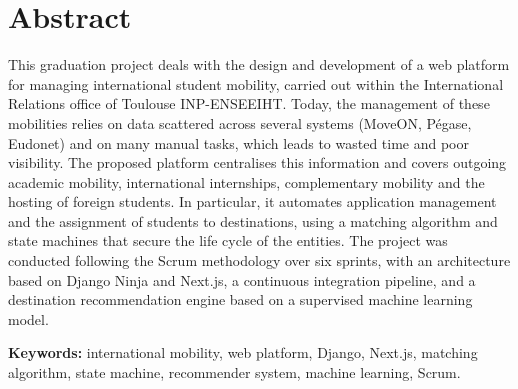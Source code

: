 \begingroup
\titlespacing*{\chapter}{0pt}{-55pt}{18pt}%
\vspace*{55pt}%
\let\clearpage\relax
\let\cleardoublepage\relax
\chapter*{Abstract}
\endgroup
{}
{}

\justifying
This graduation project deals with the design and development of a web platform
for managing international student mobility, carried out within the
International Relations office of Toulouse INP-ENSEEIHT. Today, the management of
these mobilities relies on data scattered across several systems (MoveON,
Pégase, Eudonet) and on many manual tasks, which leads to wasted time and poor
visibility. The proposed platform centralises this information and covers
outgoing academic mobility, international internships, complementary mobility and
the hosting of foreign students. In particular, it automates application
management and the assignment of students to destinations, using a matching
algorithm and state machines that secure the life cycle of the entities. The
project was conducted following the Scrum methodology over six sprints, with an
architecture based on Django Ninja and Next.js, a continuous integration
pipeline, and a destination recommendation engine based on a supervised machine
learning model.

\vspace{0.25cm}
\noindent\textbf{Keywords:} international mobility, web platform, Django, Next.js,
matching algorithm, state machine, recommender system, machine learning, Scrum.

\titlespacing*{\chapter}{0pt}{-55pt}{40pt}%
